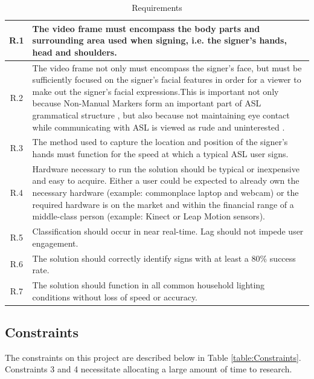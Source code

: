 \documentclass[12pt]{article}
\begin{document}
\begin{table}[H]
\centering
\caption{Requirements}
\label{table:Requirements}
\begin{tabular}{|c| p{14cm} |}
	\hline
	R.1 & The video frame must encompass the body parts and surrounding area used when signing, i.e. the signer’s hands, head and shoulders. \\ \hline
	R.2 & The video frame not only must encompass the signer’s face, but must be sufficiently focused on the signer’s facial features in order for a viewer to make out the signer’s facial expressions.This is important not only because Non-Manual Markers form an important part of ASL grammatical structure \cite{ASLU}, but also because not maintaining eye contact while communicating with ASL is viewed as rude and uninterested \cite{Expression}. \\ \hline
	R.3 & The method used to capture the location and position of the signer’s hands must function for the speed at which a typical ASL user signs. \\ \hline
	R.4 & Hardware necessary to run the solution should be typical or inexpensive and easy to acquire. Either a user could be expected to already own the necessary hardware (example: commonplace laptop and webcam) or the required hardware is on the market and within the financial range of a middle-class person (example: Kinect or Leap Motion sensors). \\ \hline
	R.5 & Classification should occur in near real-time. Lag should not impede user engagement. \\ \hline
	R.6 & The solution should correctly identify signs with at least a 80\% success rate. \\ \hline
	R.7 & The solution should function in all common household lighting conditions without loss of speed or accuracy. \\ \hline
\end{tabular}
\end{table}

\subsection{Constraints}
The constraints on this project are described below in Table \ref{table:Constraints}. Constraints 3 and 4 necessitate allocating a large amount of time to research.
\end{document}
